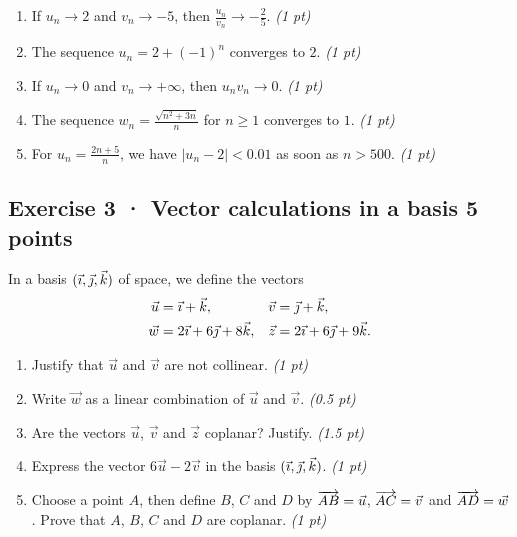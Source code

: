 \begin{enumerate}

\item If $u_n\to 2$ and $v_n\to-5$, then $\frac{u_n}{v_n}\to-\frac{2}{5}$. \hfill\textit{(1 pt)}

\item The sequence $u_n=2+(-1)^n$ converges to $2$. \hfill\textit{(1 pt)}

\item If $u_n\to0$ and $v_n\to+\infty$, then $u_nv_n\to0$. \hfill\textit{(1 pt)}

\item The sequence $w_n=\frac{\sqrt{n^2+3n}}{n}$ for $n\ge1$ converges to $1$. \hfill\textit{(1 pt)}

\item For $u_n=\frac{2n+5}{n}$, we have $|u_n-2|<0.01$ as soon as $n> 500$. \hfill\textit{(1 pt)}

\end{enumerate}

\clearpage{}\par

\subsection*{Exercise 3 · Vector calculations in a basis \hfill 5 points}In a basis $(\vec{\imath},\vec{\jmath},\vec k)$ of space, we define the vectors
\[\begin{aligned}\vec u&=\vec{\imath}+\vec k,&\vec v&=\vec{\jmath}+\vec k,\\
\vec w&=2\vec{\imath}+6\vec{\jmath}+8\vec k,&\vec z&=2\vec{\imath}+6\vec{\jmath}+9\vec k.\end{aligned}\]

\begin{enumerate}

\item Justify that $\vec u$ and $\vec v$ are not collinear. \hfill\textit{(1 pt)}

\item Write $\vec w$ as a linear combination of $\vec u$ and $\vec v$. \hfill\textit{(0.5 pt)}

\item Are the vectors $\vec u$, $\vec v$ and $\vec z$ coplanar? Justify. \hfill\textit{(1.5 pt)}

\item Express the vector $6\vec u-2\vec v$ in the basis $(\vec{\imath},\vec{\jmath},\vec k)$. \hfill\textit{(1 pt)}

\item Choose a point $A$, then define $B$, $C$ and $D$ by $\overrightarrow{AB}=\vec u$, $\overrightarrow{AC}=\vec v$ and $\overrightarrow{AD}=\vec w$. Prove that $A$, $B$, $C$ and $D$ are coplanar. \hfill\textit{(1 pt)}

\end{enumerate}

